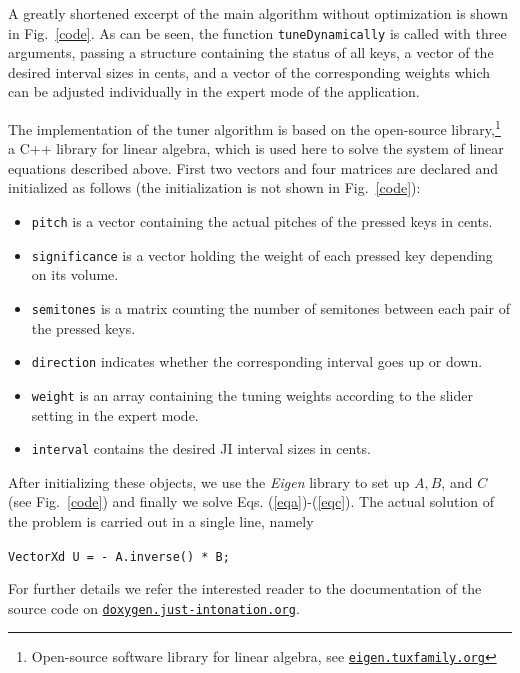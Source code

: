 A greatly shortened excerpt of the main algorithm without optimization is shown in Fig.~\ref{code}. As can be seen, the function {\tt tuneDynamically} is called with three arguments, passing a structure containing the status of all keys, a vector of the desired interval sizes in cents, and a vector of the corresponding weights which can be adjusted individually in the expert mode of the application.

The implementation of the tuner algorithm is based on the open-source library,\footnote{Open-source software library for linear algebra, see \href{http://eigen.tuxfamily.org}{\tt eigen.tuxfamily.org}} a C++ library for linear algebra, which is used here to solve the system of linear equations described above. First two vectors and four matrices are declared and initialized as follows (the initialization is not shown in Fig.~\ref{code}):
%
\begin{itemize}
 \item {\tt pitch} is a vector containing the actual pitches of the pressed keys in cents.
 \item {\tt significance} is a vector holding the weight of each pressed key depending on its volume.
 \item {\tt semitones} is a matrix counting the number of semitones between each pair of the pressed keys.
 \item {\tt direction} indicates whether the corresponding interval goes up or down.
 \item {\tt weight} is an array containing the tuning weights according to the slider setting in the expert mode.
 \item {\tt interval} contains the desired JI interval sizes in cents.
\end{itemize}
After initializing these objects, we use the \textit{Eigen} library to set up $A,B$, and $C$ (see Fig.~\ref{code}) and finally we solve Eqs. (\ref{eqa})-(\ref{eqc}). The actual solution of the problem is carried out in a single line, namely

\begin{center}
{ \tt VectorXd U = - A.inverse() * B; }
\end{center}

For further details we refer the interested reader to the documentation of the source code on \href{http://doxygen.just-intonation.org}{\tt doxygen.just-intonation.org}.

